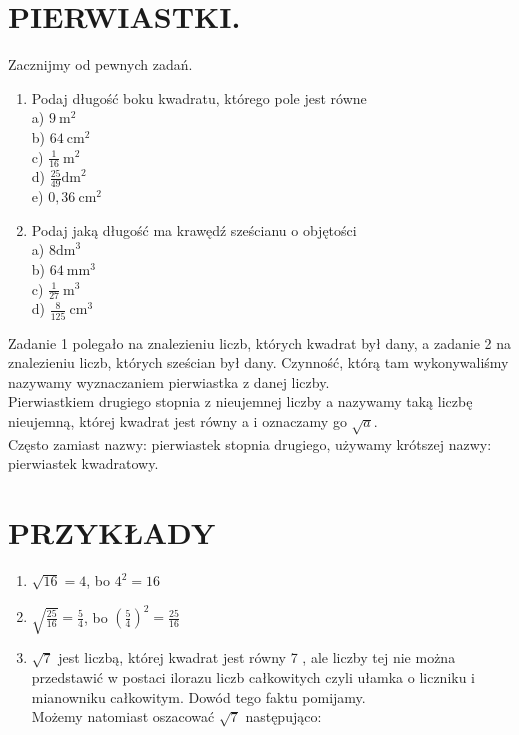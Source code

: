 \documentclass[10pt]{article}
\begin{document}
\section*{PIERWIASTKI.}
Zacznijmy od pewnych zadań.

\begin{enumerate}
  \item Podaj długość boku kwadratu, którego pole jest równe\\
a) \(9 \mathrm{~m}^{2}\)\\
b) \(64 \mathrm{~cm}^{2}\)\\
c) \(\frac{1}{16} \mathrm{~m}^{2}\)\\
d) \(\frac{25}{49} \mathrm{dm}^{2}\)\\
e) \(0,36 \mathrm{~cm}^{2}\)
  \item Podaj jaką długość ma krawędź sześcianu o objętości\\
a) \(8 \mathrm{dm}^{3}\)\\
b) \(64 \mathrm{~mm}^{3}\)\\
c) \(\frac{1}{27} \mathrm{~m}^{3}\)\\
d) \(\frac{8}{125} \mathrm{~cm}^{3}\)
\end{enumerate}

Zadanie 1 polegało na znalezieniu liczb, których kwadrat był dany, a zadanie 2 na znalezieniu liczb, których sześcian był dany. Czynność, którą tam wykonywaliśmy nazywamy wyznaczaniem pierwiastka z danej liczby.\\
Pierwiastkiem drugiego stopnia z nieujemnej liczby a nazywamy taką liczbę nieujemną, której kwadrat jest równy a i oznaczamy go \(\sqrt{a}\).\\
Często zamiast nazwy: pierwiastek stopnia drugiego, używamy krótszej nazwy: pierwiastek kwadratowy.

\section*{PRZYKŁADY}
\begin{enumerate}
  \item \(\sqrt{16}=4\), bo \(4^{2}=16\)
  \item \(\sqrt{\frac{25}{16}}=\frac{5}{4}\), bo \(\left(\frac{5}{4}\right)^{2}=\frac{25}{16}\)
  \item \(\sqrt{7}\) jest liczbą, której kwadrat jest równy 7 , ale liczby tej nie można przedstawić w postaci ilorazu liczb całkowitych czyli ułamka o liczniku i mianowniku całkowitym. Dowód tego faktu pomijamy.\\
Możemy natomiast oszacować \(\sqrt{7}\) następująco:
\end{enumerate}
\end{document}
